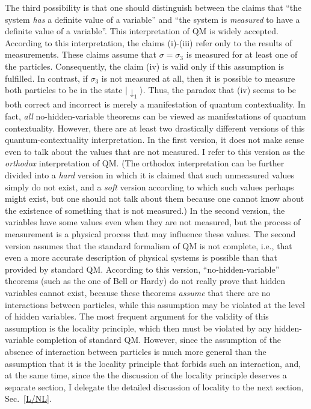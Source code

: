 \documentclass[12pt]{article}
\begin{document}
The third possibility is that one should distinguish between 
the claims that ``the system {\em has} a definite value of a variable'' 
and ``the system is {\em measured} to have a definite value of a variable''.
This interpretation of QM is widely accepted. According to this 
interpretation, the claims (i)-(iii) refer only to the results of 
measurements. These claims assume that $\sigma=\sigma_3$ is measured 
for at least one of the particles. Consequently, the claim 
(iv) is valid only if this assumption is fulfilled. In contrast, 
if $\sigma_3$ is not measured at all, then it is possible to measure 
both particles to be in the state $|\!\downarrow_1\rangle$.
Thus, the paradox that (iv) seems to be both correct and incorrect 
is merely a manifestation of quantum contextuality. 
In fact, {\em all} no-hidden-variable theorems can be viewed 
as manifestations of quantum contextuality. 
However, there are at least two drastically different versions of this
quantum-contextuality interpretation. 
In the first version, it does not make sense even to talk about 
the values that are not measured. I refer to this version 
as the {\em orthodox} interpretation of QM. (The orthodox 
interpretation can be further divided into a {\em hard} version 
in which it is claimed that such unmeasured values simply
do not exist, and a {\em soft} version according to which
such values perhaps might exist, but  
one should not talk about them because one cannot know about the 
existence of something that is not measured.)
In the second version, the variables have some values even 
when they are not measured, but the process of measurement is a 
physical process that may influence these values. The second 
version assumes that the standard formalism of QM is not complete, 
i.e., that even a more accurate description of physical systems 
is possible than that provided by standard QM. According to this version, 
``no-hidden-variable'' theorems (such as the one of Bell or Hardy)
do not really prove that hidden variables cannot exist, because
these theorems {\em assume} that there are no interactions 
between particles, while this assumption may be violated  
at the level of hidden variables. 
%
The most frequent argument for the validity of this assumption
is the locality principle, which then must be violated 
by any hidden-variable completion of standard QM.
However, since the assumption of the absence of interaction 
between particles is much more general than the assumption
that it is the locality principle that forbids 
such an interaction, and, at the same time, since the 
the discussion of the locality principle deserves 
a separate section, I delegate the detailed discussion of 
locality to the next section, Sec.~\ref{L/NL}. 
%
\end{document}

